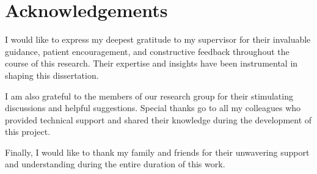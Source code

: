 \chapter*{Acknowledgements}
\begingroup
\justifying
\setlength{\parindent}{0pt}
\setlength{\parskip}{0.5\baselineskip}

I would like to express my deepest gratitude to my supervisor for their invaluable guidance, patient encouragement, and constructive feedback throughout the course of this research. Their expertise and insights have been instrumental in shaping this dissertation.

I am also grateful to the members of our research group for their stimulating discussions and helpful suggestions. Special thanks go to all my colleagues who provided technical support and shared their knowledge during the development of this project.

Finally, I would like to thank my family and friends for their unwavering support and understanding during the entire duration of this work.

\endgroup

